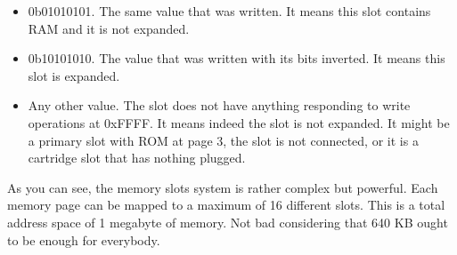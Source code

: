 \begin{itemize}
	\item 0b01010101. The same value that was written. It means this slot contains RAM and it is not expanded.
	\item 0b10101010. The value that was written with its bits inverted. It means this slot is expanded.
	\item Any other value. The slot does not have anything responding to write operations at 0xFFFF. It means indeed the slot is not expanded. It might be a primary slot with ROM at page 3, the slot is not connected, or it is a cartridge slot that has nothing plugged.
\end{itemize}

As you can see, the memory slots system is rather complex but powerful. Each memory page can be mapped to a maximum of 16 different slots. This is a total address space of 1 megabyte of memory. Not bad considering that 640 KB ought to be enough for everybody. 

